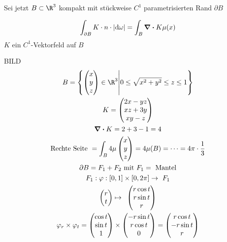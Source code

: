 Sei jetzt $B \subset \R^3$ kompakt mit stückweise $C^1$ parametrisierten Rand $\partial B$
\begin{satz*}[note = {Satz von Gauss = Divergenzsatz}]%
	\[ \int_{\partial B} K \cdot n \cdot \abs{\dd \omega} = \int_B \div K \mu(x) \]
	$K$ ein $C^1$-Vektorfeld auf $B$
\end{satz*}
\begin{bsp*}
	BILD
	\begin{gather*}
		B = \left\{ \begin{pmatrix} x \\ y \\ z \end{pmatrix} \in \R^3 \middle| 0 \leq \sqrt{x^2 + y^2} \leq z \leq 1 \right\} \\
		K = \begin{pmatrix} 2x - yz \\ xz + 3y \\ xy - z \end{pmatrix} \\
		\div K = 2 + 3 - 1 = 4 \\
		\text{Rechte Seite } = \int_B 4 \mu\begin{pmatrix} x \\ y \\ z \end{pmatrix} = 4 \mu(B) = \dots = 4\pi \cdot \frac{1}{3} \\
		\partial B = F_1 + F_2 \text{ mit } F_1 = \text{ Mantel} \\
		F_1 : \phi : [0,1] \times [0,2\pi] \rightarrow F_1 \\
		\begin{pmatrix} r \\ t \end{pmatrix} \mapsto \begin{pmatrix} r \cos t \\ r \sin t \\ r \end{pmatrix} \\
		\phi_r \times \phi_t = \begin{pmatrix} \cos t \\ \sin t \\ 1 \end{pmatrix} \times \begin{pmatrix} -r \sin t \\ r \cos t \\ 0 \end{pmatrix} = \begin{pmatrix} r \cos t \\ - r \sin t \\ r \end{pmatrix}

\end{gather*}
\end{bsp*}
